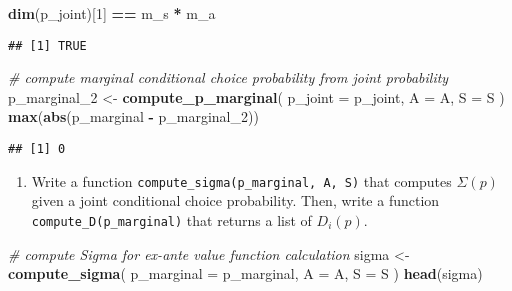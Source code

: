 \documentclass[
]{book}
\newenvironment{Shaded}{\begin{snugshade}}{\end{snugshade}}
\newcommand{\AttributeTok}[1]{\textcolor[rgb]{0.13,0.29,0.53}{#1}}
\newcommand{\CommentTok}[1]{\textcolor[rgb]{0.56,0.35,0.01}{\textit{#1}}}
\newcommand{\DecValTok}[1]{\textcolor[rgb]{0.00,0.00,0.81}{#1}}
\newcommand{\FunctionTok}[1]{\textcolor[rgb]{0.13,0.29,0.53}{\textbf{#1}}}
\newcommand{\NormalTok}[1]{#1}
\newcommand{\OtherTok}[1]{\textcolor[rgb]{0.56,0.35,0.01}{#1}}
\newcommand{\SpecialCharTok}[1]{\textcolor[rgb]{0.81,0.36,0.00}{\textbf{#1}}}
\providecommand{\tightlist}{%
  \setlength{\itemsep}{0pt}\setlength{\parskip}{0pt}}
\begin{document}
\begin{Shaded}
\begin{Highlighting}[]
\FunctionTok{dim}\NormalTok{(p\_joint)[}\DecValTok{1}\NormalTok{] }\SpecialCharTok{==}\NormalTok{ m\_s }\SpecialCharTok{*}\NormalTok{ m\_a}
\end{Highlighting}
\end{Shaded}

\begin{verbatim}
## [1] TRUE
\end{verbatim}

\begin{Shaded}
\begin{Highlighting}[]
\CommentTok{\# compute marginal conditional choice probability from joint probability}
\NormalTok{p\_marginal\_2 }\OtherTok{\textless{}{-}} 
  \FunctionTok{compute\_p\_marginal}\NormalTok{(}
    \AttributeTok{p\_joint =}\NormalTok{ p\_joint, }
    \AttributeTok{A =}\NormalTok{ A,}
    \AttributeTok{S =}\NormalTok{ S}
\NormalTok{    )}
\FunctionTok{max}\NormalTok{(}\FunctionTok{abs}\NormalTok{(p\_marginal }\SpecialCharTok{{-}}\NormalTok{ p\_marginal\_2))}
\end{Highlighting}
\end{Shaded}

\begin{verbatim}
## [1] 0
\end{verbatim}

\begin{enumerate}
\def\labelenumi{\arabic{enumi}.}
\setcounter{enumi}{5}
\tightlist
\item
  Write a function \texttt{compute\_sigma(p\_marginal,\ A,\ S)} that computes \(\Sigma(p)\) given a joint conditional choice probability. Then, write a function \texttt{compute\_D(p\_marginal)} that returns a list of \(D_i(p)\).
\end{enumerate}

\begin{Shaded}
\begin{Highlighting}[]
\CommentTok{\# compute Sigma for ex{-}ante value function calculation}
\NormalTok{sigma }\OtherTok{\textless{}{-}} 
  \FunctionTok{compute\_sigma}\NormalTok{(}
    \AttributeTok{p\_marginal =}\NormalTok{ p\_marginal,}
    \AttributeTok{A =}\NormalTok{ A,}
    \AttributeTok{S =}\NormalTok{ S}
\NormalTok{    )}
\FunctionTok{head}\NormalTok{(sigma)}
\end{Highlighting}
\end{Shaded}
\end{document}
